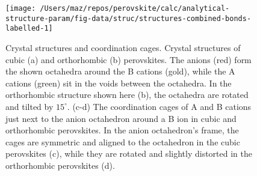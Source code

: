 \documentclass[a4paper,prb,twocolumn]{revtex4-1}  %
\begin{document}
\begin{figure}[htbp]
\begin{center}
\texttt{[image: /Users/maz/repos/perovskite/calc/analytical-structure-param/fig-data/struc/structures-combined-bonds-labelled-1]}
\caption{
Crystal structures and coordination cages.
Crystal structures of cubic (a) and orthorhombic (b) perovskites.
The anions (red) form the shown octahedra around 
the B cations (gold), while the A cations (green) sit in the voids between the octahedra.
In the orthorhombic structure shown here (b),
 the octahedra are rotated and tilted by $15^\circ$.
(c-d)
The coordination cages of A %
and B 
cations just next to the anion 
octahedron
around a B ion in cubic %
 and orthorhombic %
  perovskites.
In the anion octahedron's frame,
the cages are symmetric and aligned to the octahedron in the cubic perovskites (c),
while they are rotated and slightly distorted in the orthorhombic perovskites (d).
}
\label{fig:struc}
\end{center}
\end{figure}
\end{document}
